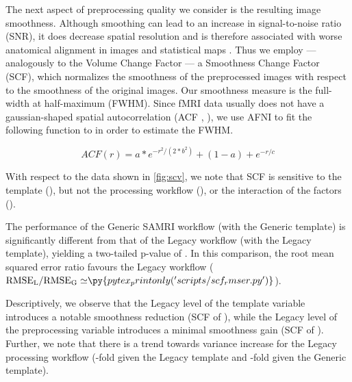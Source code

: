The next aspect of preprocessing quality we consider is the resulting image smoothness.
Although smoothing can lead to an increase in signal-to-noise ratio (SNR), it does decrease spatial resolution and is therefore associated with  worse anatomical alignment in images and statistical maps \cite{fmriprep}.
Thus we employ --- analogously to the Volume Change Factor --- a Smoothness Change Factor (SCF), which normalizes the smoothness of the preprocessed images with respect to the smoothness of the original images.
Our smoothness measure is the full-width at half-maximum (FWHM).
Since fMRI data usually does not have a gaussian-shaped spatial autocorrelation (ACF \cite{eklund2016cluster}, \cite{cox2017fmri}), we use AFNI \cite{cox1996afni} to fit the following function to in order to estimate the FWHM.

\begin{equation} \label{eq:acf}
        ACF(r)
        = a * e^{ -r^{2}/ (2 * b^{2}) } + (1 - a) + e^{-r/c}
\end{equation}

With respect to the data shown in \cref{fig:scv}, we note that SCF is sensitive to
the template (),
but not
the processing workflow (),
or the interaction of the factors ().

The performance of the Generic SAMRI workflow (with the Generic template) is significantly different from that of the Legacy workflow (with the Legacy template), yielding a two-tailed p-value of .
In this comparison, the root mean squared error ratio favours the Legacy workflow
($\mathrm{RMSE_{L}/RMSE_{G}\simeq} \py{pytex_printonly('scripts/scf_rmser.py')}$).

Descriptively, we observe that the Legacy level of the template variable introduces a notable smoothness reduction
(SCF of ),
while the Legacy level of the preprocessing variable introduces a minimal smoothness gain
(SCF of ).
Further, we note that there is a trend towards variance increase for the Legacy processing workflow
(-fold given the Legacy template and -fold given the Generic template).


